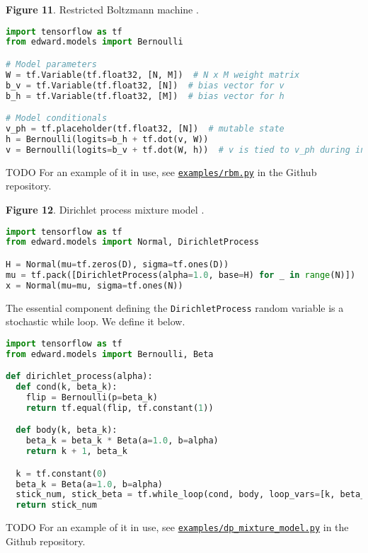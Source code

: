 \textbf{Figure 11}. Restricted Boltzmann machine \citep{smolensky1986information}.
\begin{lstlisting}[language=python]
import tensorflow as tf
from edward.models import Bernoulli

# Model parameters
W = tf.Variable(tf.float32, [N, M])  # N x M weight matrix
b_v = tf.Variable(tf.float32, [N])  # bias vector for v
b_h = tf.Variable(tf.float32, [M])  # bias vector for h

# Model conditionals
v_ph = tf.placeholder(tf.float32, [N])  # mutable state
h = Bernoulli(logits=b_h + tf.dot(v, W))
v = Bernoulli(logits=b_v + tf.dot(W, h))  # v is tied to v_ph during inference
\end{lstlisting}
TODO
For an example of it in use, see
\href{https://github.com/blei-lab/edward/blob/master/examples/rbm.py}{\texttt{examples/rbm.py}}
in the Github repository.

\textbf{Figure 12}. Dirichlet process mixture model \citep{antoniak1974mixtures}.
\begin{lstlisting}[language=python]
import tensorflow as tf
from edward.models import Normal, DirichletProcess

H = Normal(mu=tf.zeros(D), sigma=tf.ones(D))
mu = tf.pack([DirichletProcess(alpha=1.0, base=H) for _ in range(N)])
x = Normal(mu=mu, sigma=tf.ones(N))
\end{lstlisting}
The essential component defining the \texttt{DirichletProcess} random
variable is a stochastic while loop. We define it below.
\begin{lstlisting}[language=python]
import tensorflow as tf
from edward.models import Bernoulli, Beta

def dirichlet_process(alpha):
  def cond(k, beta_k):
    flip = Bernoulli(p=beta_k)
    return tf.equal(flip, tf.constant(1))

  def body(k, beta_k):
    beta_k = beta_k * Beta(a=1.0, b=alpha)
    return k + 1, beta_k

  k = tf.constant(0)
  beta_k = Beta(a=1.0, b=alpha)
  stick_num, stick_beta = tf.while_loop(cond, body, loop_vars=[k, beta_k])
  return stick_num
\end{lstlisting}
TODO
For an example of it in use, see
\href{https://github.com/blei-lab/edward/blob/master/examples/dp_mixture_model.py}{\texttt{examples/dp_mixture_model.py}}
in the Github repository.

